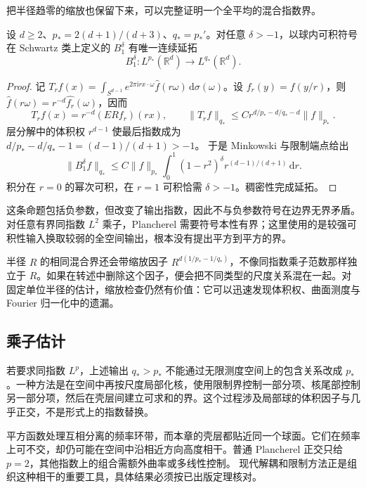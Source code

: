 把半径趋零的缩放也保留下来，可以完整证明一个全平均的混合指数界。
\begin{proposition}\label{b2:prop:24-mixed-bound}
设 \(d\geq2\)、\(p_*=2(d+1)/(d+3)\)、\(q_*=p_*'\)。对任意 \(\delta>-1\)，以球内可积符号在 Schwartz 类上定义的 \(B_1^\delta\) 有唯一连续延拓
\[
 B_1^\delta:L^{p_*}(\mathbb R^d)\longrightarrow L^{q_*}(\mathbb R^d).
\]
\end{proposition}
\begin{proof}
记 \(T_r f(x)=\int_{S^{d-1}}e^{2\pi\mathrm irx\cdot\omega}
\widehat f(r\omega)\,\mathrm d\sigma(\omega)\)。设 \(f_r(y)=f(y/r)\)，则
\(\widehat f(r\omega)=r^{-d}\widehat{f_r}(\omega)\)，因而
\[
 T_r f(x)=r^{-d}(ERf_r)(rx),\qquad
 \|T_r f\|_{q_*}\leq C r^{d/p_*-d/q_*-d}\|f\|_{p_*}.
\]
层分解中的体积权 \(r^{d-1}\) 使最后指数成为
\(d/p_*-d/q_*-1=(d-1)/(d+1)>-1\)。
于是 Minkowski 与限制端点给出
\[
 \|B_1^\delta f\|_{q_*}\leq C\|f\|_{p_*}
 \int_0^1(1-r^2)^\delta r^{(d-1)/(d+1)}\,\mathrm dr.
\]
积分在 \(r=0\) 的幂次可积，在 \(r=1\) 可积恰需 \(\delta>-1\)。稠密性完成延拓。
\end{proof}
这条命题包括负参数，但改变了输出指数，因此不与负参数符号在边界无界矛盾。对任意有界同指数 \(L^2\) 乘子，Plancherel 需要符号本性有界；这里使用的是较强可积性输入换取较弱的全空间输出，根本没有提出平方到平方的界。

\ProseParagraphBreak

半径 \(R\) 的相同混合界还会带缩放因子
\(R^{d(1/p_*-1/q_*)}\)，不像同指数乘子范数那样独立于 \(R\)。如果在转述中删除这个因子，便会把不同类型的尺度关系混在一起。对固定单位半径的估计，缩放检查仍然有价值：它可以迅速发现体积权、曲面测度与 Fourier 归一化中的遗漏。

\subsection{乘子估计}
\label{b2:subsec:240403}

若要求同指数 \(L^p\)，上述输出 \(q_*>p_*\) 不能通过无限测度空间上的包含关系改成 \(p_*\)。一种方法是在空间中再按尺度局部化核，使用限制界控制一部分项、核尾部控制另一部分项，然后在壳层间建立可求和的界。这个过程涉及局部球的体积因子与几乎正交，不是形式上的指数替换。

\ProseParagraphBreak
{}平方函数处理互相分离的频率环带，而本章的壳层都贴近同一个球面。它们在频率上可不交，却仍可能在空间中沿相近方向高度相干。普通 Plancherel 正交只给 \(p=2\)，其他指数上的组合需额外曲率或多线性控制。
现代解耦和限制方法正是组织这种相干的重要工具，具体结果必须按已出版定理核对。

